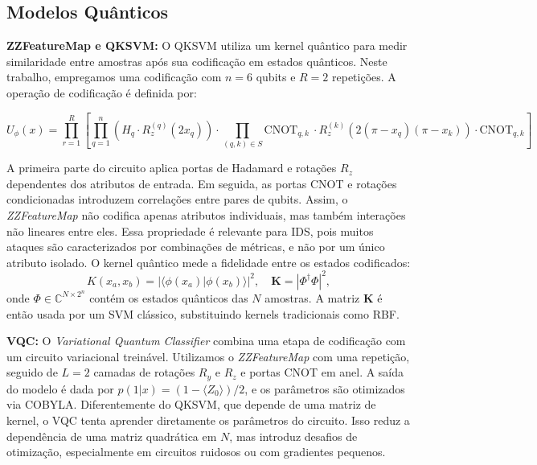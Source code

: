 \documentclass[12pt]{article}
\begin{document}
\subsection{Modelos Quânticos}

\textbf{ZZFeatureMap e QKSVM:} O QKSVM utiliza um kernel quântico para medir similaridade entre amostras após sua codificação em estados quânticos. Neste trabalho, empregamos uma codificação com $n=6$ qubits e $R=2$ repetições. A operação de codificação é definida por:


\begin{equation}
U_\phi(x) =
\prod_{r=1}^{R}
\left[
\prod_{q=1}^{n}
\left(H_q \cdot R_z^{(q)}(2x_q)\right)
\cdot
\prod_{(q,k) \in S}
\mathrm{CNOT}_{q,k}\
\cdot
R_z^{(k)}\left(2(\pi - x_q)(\pi - x_k)\right)
\cdot
\mathrm{CNOT}_{q,k}
\right]
\label{eq:zzfeaturemap}
\end{equation}


A primeira parte do circuito aplica portas de Hadamard e rotações $R_z$ dependentes dos atributos de entrada. Em seguida, as portas CNOT e rotações condicionadas introduzem correlações entre pares de qubits. Assim, o \textit{ZZFeatureMap} não codifica apenas atributos individuais, mas também interações não lineares entre eles. Essa propriedade é relevante para IDS, pois muitos ataques são caracterizados por combinações de métricas, e não por um único atributo isolado. O kernel quântico mede a fidelidade entre os estados codificados:
\begin{equation}
K(x_a, x_b) =
\left|\langle \phi(x_a) | \phi(x_b) \rangle\right|^2, \quad
\mathbf{K} = \left|\Phi^\dagger \Phi\right|^2,
\label{eq:kernel}
\end{equation}
onde $\Phi \in \mathbb{C}^{N \times 2^n}$ contém os estados quânticos das $N$ amostras. A matriz $\mathbf{K}$ é então usada por um SVM clássico, substituindo kernels tradicionais como RBF.

\textbf{VQC:} O \textit{Variational Quantum Classifier} combina uma etapa de codificação com um circuito variacional treinável. Utilizamos o \textit{ZZFeatureMap} com uma repetição, seguido de $L=2$ camadas de rotações $R_y$ e $R_z$ e portas CNOT em anel. A saída do modelo é dada por $p(1|x) = (1-\langle Z_0\rangle)/2$, e os parâmetros são otimizados via COBYLA. Diferentemente do QKSVM, que depende de uma matriz de kernel, o VQC tenta aprender diretamente os parâmetros do circuito. Isso reduz a dependência de uma matriz quadrática em $N$, mas introduz desafios de otimização, especialmente em circuitos ruidosos ou com gradientes pequenos.
\end{document}
